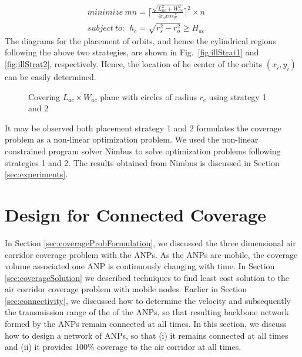 \documentclass[10pt]{IEEEtran}
\begin{document}
\begin{eqnarray}
minimize~mn = \lceil \frac{\sqrt{L_{ac}^{2} + W_{ac}^{2}}}{4r_{o}cos\frac{\pi}{n}} \rceil^{2} \times n &&\label{eq:s2obj} \\
subject~to:~~h_{c}  = \sqrt{r_{s}^{2} - r_{o}^{2}} \geq  H_{ac} && \label{eq:s2cons}
\end{eqnarray}
The diagrams for the placement of orbits, and hence the cylindrical regions following the above two strategies, are shown in Fig.~\ref{fig:illStrat1} and \ref{fig:illStrat2}, respectively. Hence, the location of he center of the orbits $(x_{i},y_{i})$ can be easily determined.
\begin{figure}[!t]
\centering
{}
\hfill
{}
\caption{Covering $L_{ac}\times W_{ac}$ plane with circles of radius $r_{c}$ using strategy 1 and 2}
\label{fig:strats}
\end{figure}
It may be observed both placement strategy 1 and 2 formulates the coverage problem as a non-linear optimization problem. We used the non-linear constrained program solver Nimbus \cite{nimbus} to solve optimization problems following strategies 1 and 2. The results obtained from Nimbus is discussed in Section \ref{sec:experiments}.

\section{Design for Connected Coverage}
\label{sec:connCoverage}

In Section \ref{sec:coverageProbFormulation}, we discussed the three dimensional air corridor coverage problem with the ANPs. As the ANPs are mobile, the coverage volume associated one ANP is continuously changing with time. In Section \ref{sec:coverageSolution} we described techniques to find least cost solution to the air corridor coverage problem with mobile nodes. Earlier in Section \ref{sec:connectivity}, we discussed how to determine the velocity and subsequently the transmission range of the of the ANPs, so that resulting backbone network formed by the ANPs remain connected at all times. In this section, we discuss how to design a network of ANPs, so that (i) it remains connected at all times and (ii) it provides 100\% coverage to the air corridor at all times.
\end{document}
